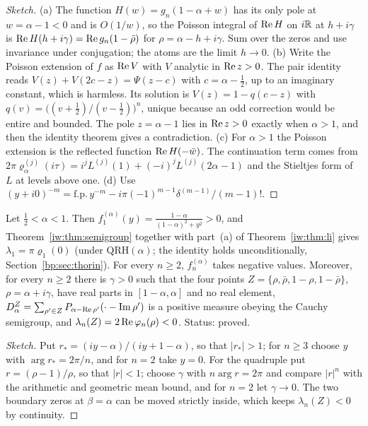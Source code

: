 \begin{proof}[Sketch]
(a) The function $H(w)=g_n(1-\alpha+w)$ has its only pole at $w=\alpha-1<0$ and is $O(1/w)$, so the Poisson integral of $\operatorname{Re} H$ on $i\mathbb{R}$ at $h+i\gamma$ is $\operatorname{Re} H(h+i\gamma)=\operatorname{Re} g_n(1-\bar\rho)$ for $\rho=\alpha-h+i\gamma$. Sum over the zeros and use invariance under conjugation; the atoms are the limit $h\to0$. (b) Write the Poisson extension of $f$ as $\operatorname{Re} V$ with $V$ analytic in $\operatorname{Re} z>0$. The pair identity reads $V(z)+V(2c-z)=\Psi(z-c)$ with $c=\alpha-\frac12$, up to an imaginary constant, which is harmless. Its solution is $V(z)=1-q(c-z)$ with $q(v)=\big((v+\frac12)/(v-\frac12)\big)^n$, unique because an odd correction would be entire and bounded. The pole $z=\alpha-1$ lies in $\operatorname{Re} z>0$ exactly when $\alpha>1$, and then the identity theorem gives a contradiction. (c) For $\alpha>1$ the Poisson extension is the reflected function $\operatorname{Re} H(-\bar w)$. The continuation term comes from $2\pi\varrho_\alpha^{(j)}(i\tau)=i^jL^{(j)}(1)+(-i)^jL^{(j)}(2\alpha-1)$ and the Stieltjes form of $L$ at levels above one. (d) Use $(y+i0)^{-m}=\mathrm{f.p.}\,y^{-m}-i\pi(-1)^{m-1}\delta^{(m-1)}/(m-1)!$.
\end{proof}

\begin{proposition}\label{iw:prop:lisign}
Let $\frac12<\alpha<1$. Then $f_1^{(\alpha)}(y)=\frac{1-\alpha}{(1-\alpha)^2+y^2}>0$, and Theorem~\ref{iw:thm:semigroup} together with part~(a) of Theorem~\ref{iw:thm:li} gives $\lambda_1=\pi\varrho_1(0)$ (under $\mathrm{QRH}(\alpha)$; the identity holds unconditionally, Section~\ref{bp:sec:thorin}). For every $n\ge2$, $f_n^{(\alpha)}$ takes negative values. Moreover, for every $n\ge2$ there is $\gamma>0$ such that the four points $Z=\{\rho,\bar\rho,1-\rho,1-\bar\rho\}$, $\rho=\alpha+i\gamma$, have real parts in $[1-\alpha,\alpha]$ and no real element, $D_\alpha^Z=\sum_{\rho'\in Z}P_{\alpha-\operatorname{Re}\rho'}(\cdot-\operatorname{Im}\rho')$ is a positive measure obeying the Cauchy semigroup, and $\lambda_n(Z)=2\operatorname{Re}\varphi_n(\rho)<0$. Status: proved.
\end{proposition}

\begin{proof}[Sketch]
Put $r_*=(iy-\alpha)/(iy+1-\alpha)$, so that $|r_*|>1$; for $n\ge3$ choose $y$ with $\arg r_*=2\pi/n$, and for $n=2$ take $y=0$. For the quadruple put $r=(\rho-1)/\rho$, so that $|r|<1$; choose $\gamma$ with $n\arg r=2\pi$ and compare $|r|^n$ with the arithmetic and geometric mean bound, and for $n=2$ let $\gamma\to0$. The two boundary zeros at $\beta=\alpha$ can be moved strictly inside, which keeps $\lambda_n(Z)<0$ by continuity.
\end{proof}

